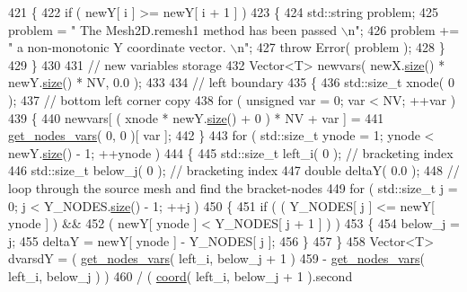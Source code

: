 \begin{DoxyCode}
421     \{
422       \textcolor{keywordflow}{if} ( newY[ i ] >= newY[ i + 1 ] )
423       \{
424         std::string problem;
425         problem = \textcolor{stringliteral}{" The Mesh2D.remesh1 method has been passed \(\backslash\)n"};
426         problem += \textcolor{stringliteral}{" a non-monotonic Y coordinate vector. \(\backslash\)n"};
427         \textcolor{keywordflow}{throw} Error( problem );
428       \}
429     \}
430 
431     \textcolor{comment}{// new variables storage}
432     Vector<T> newvars( newX.\hyperlink{classLuna_1_1Vector_ac9b6ed7a0df401728f27c193fbc8f4d8}{size}() * newY.\hyperlink{classLuna_1_1Vector_ac9b6ed7a0df401728f27c193fbc8f4d8}{size}() * NV, 0.0 );
433 
434     \textcolor{comment}{// left boundary}
435     \{
436       std::size\_t xnode( 0 );
437       \textcolor{comment}{// bottom left corner copy}
438       \textcolor{keywordflow}{for} ( \textcolor{keywordtype}{unsigned} var = 0; var < NV; ++var )
439       \{
440         newvars[ ( xnode * newY.\hyperlink{classLuna_1_1Vector_ac9b6ed7a0df401728f27c193fbc8f4d8}{size}() + 0 ) * NV + var ] =
441                                                   \hyperlink{classLuna_1_1Mesh2D_ae91c7515960ecedf43e4ed3f411080a1}{get\_nodes\_vars}( 0, 0 )[ var ];
442       \}
443       \textcolor{keywordflow}{for} ( std::size\_t ynode = 1; ynode < newY.\hyperlink{classLuna_1_1Vector_ac9b6ed7a0df401728f27c193fbc8f4d8}{size}() - 1; ++ynode )
444       \{
445         std::size\_t left\_i( 0 );  \textcolor{comment}{// bracketing index}
446         std::size\_t below\_j( 0 ); \textcolor{comment}{// bracketing index}
447         \textcolor{keywordtype}{double} deltaY( 0.0 );
448         \textcolor{comment}{// loop through the source mesh and find the bracket-nodes}
449         \textcolor{keywordflow}{for} ( std::size\_t j = 0; j < Y\_NODES.\hyperlink{classLuna_1_1Vector_ac9b6ed7a0df401728f27c193fbc8f4d8}{size}() - 1; ++j )
450         \{
451           \textcolor{keywordflow}{if} ( ( Y\_NODES[ j ] <= newY[ ynode ] ) &&
452                ( newY[ ynode ] < Y\_NODES[ j + 1 ] ) )
453           \{
454             below\_j = j;
455             deltaY = newY[ ynode ] - Y\_NODES[ j ];
456           \}
457         \}
458         Vector<T> dvarsdY = ( \hyperlink{classLuna_1_1Mesh2D_ae91c7515960ecedf43e4ed3f411080a1}{get\_nodes\_vars}( left\_i, below\_j + 1 )
459                               - \hyperlink{classLuna_1_1Mesh2D_ae91c7515960ecedf43e4ed3f411080a1}{get\_nodes\_vars}( left\_i, below\_j ) )
460                            / ( \hyperlink{classLuna_1_1Mesh2D_add4d12155922731ccf59fe4454699eed}{coord}( left\_i, below\_j + 1 ).second

\end{DoxyCode}
